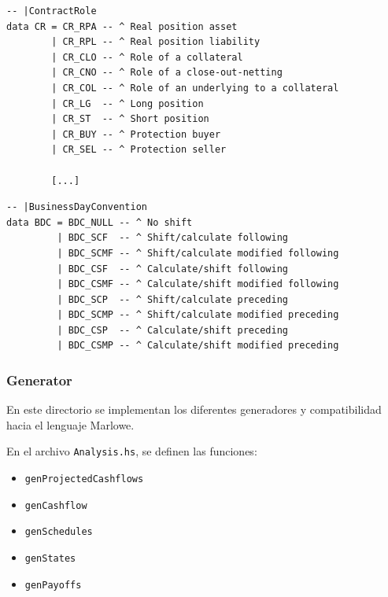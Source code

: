 \documentclass[12pt]{book}
\begin{document}
\begin{lstlisting}[style=Haskell-cardano, caption=Algunos tipos de roles de contrato]
-- |ContractRole
data CR = CR_RPA -- ^ Real position asset
        | CR_RPL -- ^ Real position liability
        | CR_CLO -- ^ Role of a collateral
        | CR_CNO -- ^ Role of a close-out-netting
        | CR_COL -- ^ Role of an underlying to a collateral
        | CR_LG  -- ^ Long position
        | CR_ST  -- ^ Short position
        | CR_BUY -- ^ Protection buyer
        | CR_SEL -- ^ Protection seller

        [...]
\end{lstlisting}


\begin{lstlisting}[style=Haskell-cardano, caption=Tipos de convención sobre días laborables]
-- |BusinessDayConvention
data BDC = BDC_NULL -- ^ No shift
         | BDC_SCF  -- ^ Shift/calculate following
         | BDC_SCMF -- ^ Shift/calculate modified following
         | BDC_CSF  -- ^ Calculate/shift following
         | BDC_CSMF -- ^ Calculate/shift modified following
         | BDC_SCP  -- ^ Shift/calculate preceding
         | BDC_SCMP -- ^ Shift/calculate modified preceding
         | BDC_CSP  -- ^ Calculate/shift preceding
         | BDC_CSMP -- ^ Calculate/shift modified preceding
\end{lstlisting}


\subsubsection{Generator}

En este directorio se implementan los diferentes generadores y compatibilidad hacia el lenguaje Marlowe.



En el archivo \texttt{Analysis.hs}, se definen las funciones:

\begin{itemize}
    \item \texttt{genProjectedCashflows}
    \item \texttt{genCashflow}
    \item \texttt{genSchedules}
    \item \texttt{genStates}
    \item \texttt{genPayoffs}
\end{itemize}
\end{document}
